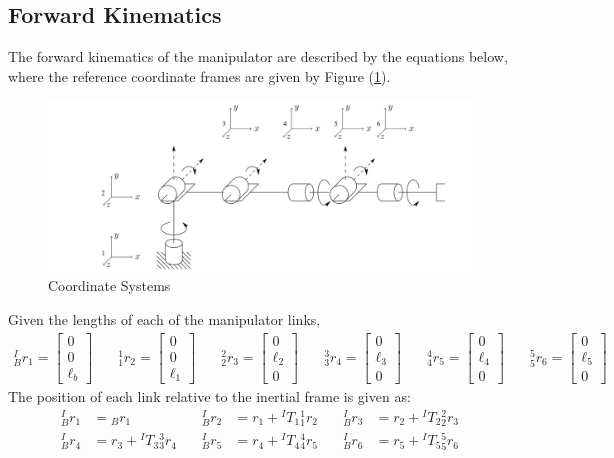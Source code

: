 \documentclass[12pt]{report}
\begin{document}
\newpage
\subsection{Forward Kinematics}
The forward kinematics of the manipulator are described by the equations below, where the reference coordinate frames are given by Figure (\ref{fig:coords}).
\begin{figure}[htp]
  \centering
  \includegraphics[width=.9\textwidth]{zero2}
  \caption{Coordinate Systems}
  \label{fig:coords}
\end{figure}

Given the lengths of each of the manipulator links,
\[
\begin{aligned}
  ^I_Br_1 = \begin{bmatrix} 0\\0\\ \ell_b\end{bmatrix} & \quad
  ^1_1r_2 = \begin{bmatrix} 0\\0\\ \ell_1\end{bmatrix} & \quad
  ^2_2r_3 = \begin{bmatrix} 0\\\ell_2\\ 0\end{bmatrix} & \quad
  ^3_3r_4 = \begin{bmatrix} 0\\\ell_3\\ 0\end{bmatrix} & \quad
  ^4_4r_5 = \begin{bmatrix} 0\\\ell_4\\ 0\end{bmatrix} & \quad
  ^5_5r_6 = \begin{bmatrix} 0\\\ell_5\\ 0\end{bmatrix} & \quad
\end{aligned}
\]
The position of each link relative to the inertial frame is given as:
\[
\begin{aligned}
^I_Br_1 &= {}_Br_1 &\quad
^I_Br_2 &= r_1 + {}^IT_1 {}^1_1r_2 &\quad
^I_Br_3 &= r_2 + {}^IT_2 {}^2_2r_3 \\
^I_Br_4 &= r_3 + {}^IT_3 {}^3_3r_4 &\quad
^I_Br_5 &= r_4 + {}^IT_4 {}^4_4r_5 &\quad
^I_Br_6 &= r_5 + {}^IT_5 {}^5_5r_6
\end{aligned}
\]
\end{document}

